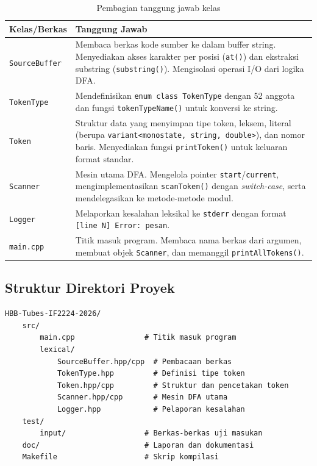 \documentclass[12pt,a4paper]{article}
\begin{document}
\begin{table}[H]
  \centering
  \begin{tabular}{lp{9cm}}
    \toprule
    \textbf{Kelas/Berkas} & \textbf{Tanggung Jawab} \\
    \midrule
    \texttt{SourceBuffer} & Membaca berkas kode sumber ke dalam buffer string. Menyediakan akses karakter per posisi (\texttt{at()}) dan ekstraksi substring (\texttt{substring()}). Mengisolasi operasi I/O dari logika DFA. \\
    \texttt{TokenType} & Mendefinisikan \texttt{enum class TokenType} dengan 52 anggota dan fungsi \texttt{tokenTypeName()} untuk konversi ke string. \\
    \texttt{Token} & Struktur data yang menyimpan tipe token, leksem, literal (berupa \texttt{variant<monostate, string, double>}), dan nomor baris. Menyediakan fungsi \texttt{printToken()} untuk keluaran format standar. \\
    \texttt{Scanner} & Mesin utama DFA. Mengelola pointer \texttt{start}/\texttt{current}, mengimplementasikan \texttt{scanToken()} dengan \textit{switch-case}, serta mendelegasikan ke metode-metode modul. \\
    \texttt{Logger} & Melaporkan kesalahan leksikal ke \texttt{stderr} dengan format \texttt{[line N] Error: pesan}. \\
    \texttt{main.cpp} & Titik masuk program. Membaca nama berkas dari argumen, membuat objek \texttt{Scanner}, dan memanggil \texttt{printAllTokens()}. \\
    \bottomrule
  \end{tabular}
  \caption{Pembagian tanggung jawab kelas}
\end{table}

\subsection{Struktur Direktori Proyek}
\begin{lstlisting}[style=bash, caption={Tata letak direktori proyek}]
HBB-Tubes-IF2224-2026/
    src/
        main.cpp                # Titik masuk program
        lexical/
            SourceBuffer.hpp/cpp  # Pembacaan berkas
            TokenType.hpp         # Definisi tipe token
            Token.hpp/cpp         # Struktur dan pencetakan token
            Scanner.hpp/cpp       # Mesin DFA utama
            Logger.hpp            # Pelaporan kesalahan
    test/
        input/                  # Berkas-berkas uji masukan
    doc/                        # Laporan dan dokumentasi
    Makefile                    # Skrip kompilasi
\end{lstlisting}
\end{document}
